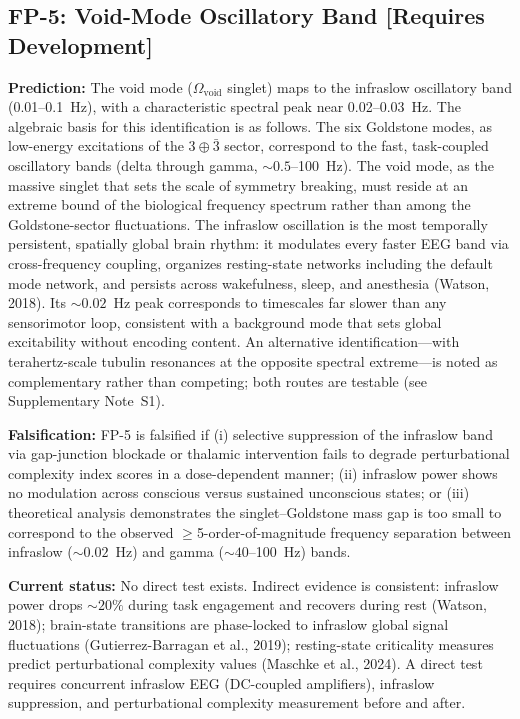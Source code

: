 \documentclass[12pt,a4paper]{article}
\begin{document}
\subsection{FP-5: Void-Mode Oscillatory Band [Requires Development]}

\textbf{Prediction:} The void mode ($\Omega_{\mathrm{void}}$ singlet) maps to the infraslow oscillatory band (0.01--0.1~Hz), with a characteristic spectral peak near 0.02--0.03~Hz. The algebraic basis for this identification is as follows. The six Goldstone modes, as low-energy excitations of the $3 \oplus \bar{3}$ sector, correspond to the fast, task-coupled oscillatory bands (delta through gamma, ${\sim}0.5$--100~Hz). The void mode, as the massive singlet that sets the scale of symmetry breaking, must reside at an extreme bound of the biological frequency spectrum rather than among the Goldstone-sector fluctuations. The infraslow oscillation is the most temporally persistent, spatially global brain rhythm: it modulates every faster EEG band via cross-frequency coupling, organizes resting-state networks including the default mode network, and persists across wakefulness, sleep, and anesthesia (Watson, 2018). Its ${\sim}0.02$~Hz peak corresponds to timescales far slower than any sensorimotor loop, consistent with a background mode that sets global excitability without encoding content. An alternative identification---with terahertz-scale tubulin resonances at the opposite spectral extreme---is noted as complementary rather than competing; both routes are testable (see Supplementary Note~S1).

\textbf{Falsification:} FP-5 is falsified if (i) selective suppression of the infraslow band via gap-junction blockade or thalamic intervention fails to degrade perturbational complexity index scores in a dose-dependent manner; (ii) infraslow power shows no modulation across conscious versus sustained unconscious states; or (iii) theoretical analysis demonstrates the singlet--Goldstone mass gap is too small to correspond to the observed $\geq$5-order-of-magnitude frequency separation between infraslow (${\sim}0.02$~Hz) and gamma (${\sim}40$--100~Hz) bands.

\textbf{Current status:} No direct test exists. Indirect evidence is consistent: infraslow power drops ${\sim}20\%$ during task engagement and recovers during rest (Watson, 2018); brain-state transitions are phase-locked to infraslow global signal fluctuations (Gutierrez-Barragan et al., 2019); resting-state criticality measures predict perturbational complexity values (Maschke et al., 2024). A direct test requires concurrent infraslow EEG (DC-coupled amplifiers), infraslow suppression, and perturbational complexity measurement before and after.
\end{document}
